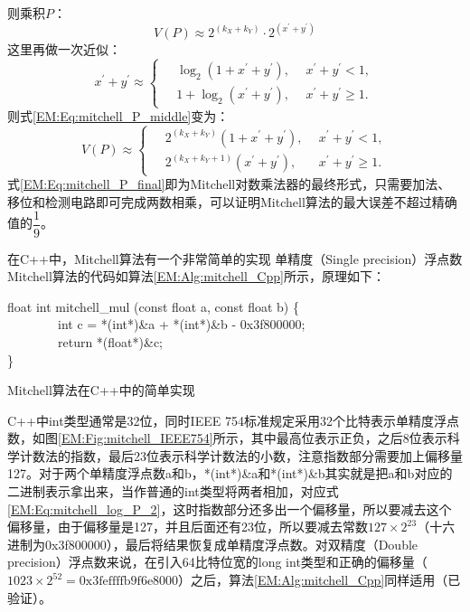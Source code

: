 则乘积$P$：
\begin{equation}
    V(P) \approx 2^{(k_X + k_Y)} \cdot 2^{(x^{\prime} + y^{\prime})}
\label{EM:Eq:mitchell_P_middle}
\end{equation}
这里再做一次近似：
\begin{equation}
    x^{\prime} + y^{\prime} \approx \left\{
    \begin{aligned}
        \ & \log_2 (1 + x^{\prime} + y^{\prime}) , & \ \ x^{\prime} + y^{\prime} < 1, \\
        \ & 1 + \log_2 (x^{\prime} + y^{\prime}), & \ \ x^{\prime} + y^{\prime} \ge 1.
    \end{aligned}
    \right.
\end{equation}
则式\eqref{EM:Eq:mitchell_P_middle}变为：
\begin{equation}
    V(P) \approx \left\{
    \begin{aligned}
        \ & 2^{(k_X + k_Y)} (1 + x^{\prime} + y^{\prime}) , & \ \ x^{\prime} + y^{\prime} < 1, \\
        \ & 2^{(k_X + k_Y + 1)} (x^{\prime} + y^{\prime}), & \ \ x^{\prime} + y^{\prime} \ge 1.
    \end{aligned}
    \right.
\label{EM:Eq:mitchell_P_final}
\end{equation}
式\eqref{EM:Eq:mitchell_P_final}即为Mitchell对数乘法器的最终形式，只需要加法、移位和检测电路即可完成两数相乘，可以证明Mitchell算法的最大误差不超过精确值的$\dfrac{1}{9}$。

在C++中，Mitchell算法有一个非常简单的实现%
单精度（Single precision）浮点数Mitchell算法的代码如算法\ref{EM:Alg:mitchell_Cpp}所示\cite{DNN:mitchell_Training}，原理如下：

\begin{algorithm}[!]
    float int mitchell\_mul (const float a, const float b) \{ \\
    \ \ \ \ \ \ \ \ int c = *(int*)\&a + *(int*)\&b - 0x3f800000; \\
    \ \ \ \ \ \ \ \ return *(float*)\&c; \\
    \}
\caption{Mitchell算法在C++中的简单实现}
\label{EM:Alg:mitchell_Cpp}
\end{algorithm}

C++中int类型通常是32位，同时IEEE 754标准规定采用32个比特表示单精度浮点数，如图\ref{EM:Fig:mitchell_IEEE754}所示，其中最高位表示正负，之后8位表示科学计数法的指数，最后23位表示科学计数法的小数，注意指数部分需要加上偏移量127。对于两个单精度浮点数a和b，*(int*)\&a和*(int*)\&b其实就是把a和b对应的二进制表示拿出来，当作普通的int类型将两者相加，对应式\eqref{EM:Eq:mitchell_log_P_2}，这时指数部分还多出一个偏移量，所以要减去这个偏移量，由于偏移量是127，并且后面还有23位，所以要减去常数$127×2^{23}$（十六进制为0x3f800000），最后将结果恢复成单精度浮点数。对双精度（Double precision）浮点数来说，在引入64比特位宽的long int类型和正确的偏移量（$1023 \times 2^{52} = \text{0x3feffffb9f6e8000}$）之后，算法\ref{EM:Alg:mitchell_Cpp}同样适用（已验证）。

